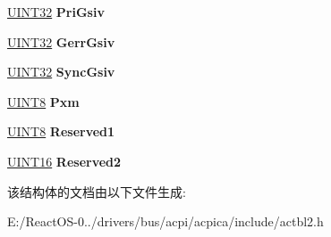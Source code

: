 \begin{DoxyCompactItemize}
\hyperlink{_processor_bind_8h_ae1e6edbbc26d6fbc71a90190d0266018}{U\+I\+N\+T32} {\bfseries Pri\+Gsiv}
\item 
\mbox{\label{structacpi__iort__smmu__v3_ae198c453af84b3e255f81793f37c2e7c}} 
\hyperlink{_processor_bind_8h_ae1e6edbbc26d6fbc71a90190d0266018}{U\+I\+N\+T32} {\bfseries Gerr\+Gsiv}
\item 
\mbox{\label{structacpi__iort__smmu__v3_ac5f62d8c3fbc8f5fa27795eab79a9b5f}} 
\hyperlink{_processor_bind_8h_ae1e6edbbc26d6fbc71a90190d0266018}{U\+I\+N\+T32} {\bfseries Sync\+Gsiv}
\item 
\mbox{\label{structacpi__iort__smmu__v3_a88997add7d58c4bc392ad70418230835}} 
\hyperlink{_processor_bind_8h_ab27e9918b538ce9d8ca692479b375b6a}{U\+I\+N\+T8} {\bfseries Pxm}
\item 
\mbox{\label{structacpi__iort__smmu__v3_a3774be84358055f64ebbabecebcc13af}} 
\hyperlink{_processor_bind_8h_ab27e9918b538ce9d8ca692479b375b6a}{U\+I\+N\+T8} {\bfseries Reserved1}
\item 
\mbox{\label{structacpi__iort__smmu__v3_a52755e5cf30da8006dbe010080df1aa8}} 
\hyperlink{_processor_bind_8h_a09f1a1fb2293e33483cc8d44aefb1eb1}{U\+I\+N\+T16} {\bfseries Reserved2}
\end{DoxyCompactItemize}


该结构体的文档由以下文件生成\+:\begin{DoxyCompactItemize}
\item 
E\+:/\+React\+O\+S-\/0../drivers/bus/acpi/acpica/include/actbl2.\+h\end{DoxyCompactItemize}
